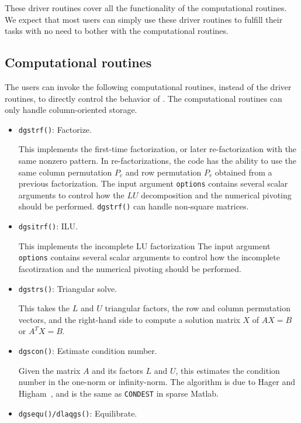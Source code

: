 These driver routines cover all the functionality of the computational
routines. We expect that most users can simply use these driver routines
to fulfill their tasks with no need to bother with the computational routines.


\subsection{Computational routines}
The users can invoke the following computational routines, instead of the
driver routines, to directly control the behavior of {\superlu}.
The computational routines can only handle column-oriented storage.

\begin{itemize}
\item {\tt dgstrf()}: Factorize.

      This implements the first-time factorization, or later re-factorization
      with the same nonzero pattern. In re-factorizations, the code
      has the ability to use the same column permutation $P_c$ and
      row permutation $P_r$ obtained from a previous factorization.
      The input argument {\tt options} contains several scalar
      arguments to control how the $LU$ decomposition and the 
      numerical pivoting should be performed. {\tt dgstrf()} can handle
      non-square matrices.

\item {\tt dgsitrf()}: ILU.

      This implements the incomplete LU factorization
      The input argument {\tt options} contains several scalar
      arguments to control how the incomplete facotirzation and the 
      numerical pivoting should be performed.

\item {\tt dgstrs()}: Triangular solve.

      This takes the $L$ and $U$ triangular factors, the row and column 
      permutation vectors, and the right-hand side to compute a solution
      matrix $X$ of $AX=B$ or $A^TX=B$.

\item {\tt dgscon()}: Estimate condition number.
      
      Given the matrix $A$ and its factors $L$ and $U$, this estimates the 
      condition number in the one-norm or infinity-norm. The algorithm is 
      due to Hager and Higham~\cite{higham96}, and is the same as 
      {\tt CONDEST} in sparse Matlab.

\item {\tt dgsequ()/dlaqgs()}: Equilibrate.


\end{itemize}
